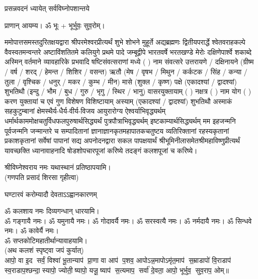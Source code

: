 {प्रसन्नवदनं ध्यायेत् सर्वविघ्नोपशान्तये}
 
प्राणान्  आयम्य।  ॐ भूः + भूर्भुवः॒ सुव॒रोम्।


ममोपात्तसमस्तदुरितक्षयद्वारा श्रीपरमेश्वरप्रीत्यर्थं शुभे शोभने मुहूर्ते अद्यब्रह्मणः
द्वितीयपरार्द्धे श्वेतवराहकल्पे वैवस्वतमन्वन्तरे अष्टाविंशतितमे कलियुगे प्रथमे पादे
जम्बूद्वीपे भारतवर्षे भरतखण्डे मेरोः दक्षिणेपार्श्वे शकाब्दे अस्मिन् वर्तमाने व्यावहारिके
 प्रभवादि षष्टिसंवत्सराणां मध्ये (	) नाम संवत्सरे उत्तरायणे / दक्षिनायने 
(ग्रीष्म / वर्ष / शरद् / हेमन्त / शिशिर / वसन्त) ऋतौ  (मेष / वृषभ / मिथुन / कर्कटक / सिंह / कन्या / तुला / 
वृश्चिक / धनुर् / मकर / कुम्भ / मीन) मासे (शुक्ल / कृष्ण) पक्षे (एकादश्यां / द्वादश्यां) शुभतिथौ
(इन्दु / भौम / बुध / गुरु / भृगु / स्थिर / भानु) वासरयुक्तायाम्
(  ) नक्षत्र (  ) नाम  योग  (  ) करण युक्तायां च एवं गुण विशेषण विशिष्टायाम्
अस्याम् (एकादश्यां / द्वादश्यां) शुभतिथौ 
अस्माकं सहकुटुम्बानां क्षेमस्थैर्य-धैर्य-वीर्य-विजय आयुरारोग्य ऐश्वर्याभिवृद्ध्यर्थम्
 धर्मार्थकाममोक्ष\-चतुर्विधफलपुरुषार्थसिद्ध्यर्थं पुत्रपौत्राभि\-वृद्ध्यर्थम् इष्टकाम्यार्थसिद्ध्यर्थम्
मम इहजन्मनि पूर्वजन्मनि जन्मान्तरे च सम्पादितानां ज्ञानाज्ञानकृतमहा\-पातकचतुष्टय
व्यतिरिक्तानां रहस्यकृतानां प्रकाशकृतानां सर्वेषां पापानां सद्य अपनोदनद्वारा सकल 
पापक्षयार्थं श्रीभूमिनीलासमेतश्रीमहाविष्णुप्रीत्यर्थं यावच्छक्ति ध्यानावाहनादि 
षोडशोपचारपूजां करिष्ये तदङ्गं कलशपूजां च करिष्ये।


श्रीविघ्नेश्वराय नमः यथास्थानं प्रतिष्ठापयामि।\\
(गणपति प्रसादं शिरसा गृहीत्वा)


{घण्टारवं करोम्यादौ देवताऽऽह्वानकारणम्}

ॐ कलशाय नमः दिव्यगन्धान् धारयामि।\\
ॐ गङ्गायै नमः। ॐ यमुनायै नमः। ॐ गोदावर्यै नमः।  ॐ सरस्वत्यै नमः। ॐ नर्मदायै नमः। ॐ सिन्धवे नमः। ॐ कावेर्यै नमः।\\
 ॐ सप्तकोटिमहातीर्थान्यावाहयामि। \\

(अथ कलशं स्पृष्ट्वा जपं कुर्यात्) \\
आपो॒ वा इ॒द सर्वं॒ विश्वा॑ भू॒तान्याप॑ प्रा॒णा वा आप॑ प॒शव॒ आपो\-ऽन्न॒मापोऽमृ॑त॒माप॑ स॒म्राडापो॑ वि॒राडाप॑ स्व॒राडाप॒श्\-छन्दा॒स्यापो॒ ज्योती॒ष्यापो॒ यजू॒ष्याप॑ स॒त्यमाप॒ सर्वा॑ दे॒वता॒ आपो॒ भूर्भुव॒ सुव॒राप॒ ओम्॥\\

